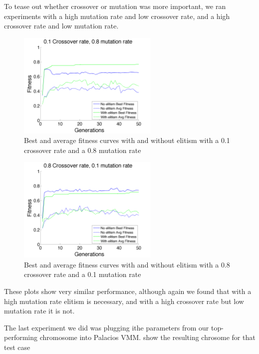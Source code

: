 \documentclass[11pt]{article}
\begin{document}
To tease out whether crossover or mutation was more important, we ran experiments with a high mutation rate and low crossover rate, and a high crossover rate and low mutation rate. 

\begin{figure}[H]
 \centering
  \includegraphics[width=0.6\textwidth,height=0.2\textheight]{figures/fitness08mut01cross.png}
  \caption{Best and average fitness curves with and without elitism with a 0.1 crossover rate and a 0.8 mutation rate}
  \label{fig:fig4}  
\end{figure}

\begin{figure}[H]
 \centering
  \includegraphics[width=0.6\textwidth,height=0.2\textheight]{figures/fitness01mut08cross.png}
  \caption{Best and average fitness curves with and without elitism with a 0.8 crossover rate and a 0.1 mutation rate}
  \label{fig:fig2}  
\end{figure}

These plots show very similar performance, although again we found that with a high mutation rate elitism is necessary, and with a high crossover rate but low mutation rate it is not.

The last experiment we did was plugging ithe parameters from our top-performing chromosome into Palacios VMM. show the resulting chrosome for that test case
\end{document}

